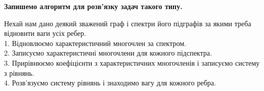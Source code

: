 \textbf{Запишемо алгоритм для розв'язку задач такого типу.}

Нехай нам дано деякий зважений граф  і  спектри його підграфів за якими треба відновити ваги усіх ребер.\\
1. Відновлюємо характеристичний многочлен за спектром.\\
2. Записуємо  характеристичні многочлени для кожного підспектра.\\ 
3. Прирівнюємо коефіцієнти з характеристичних многочленів і записуємо систему з рівнянь.\\
4. Розв'язуємо систему рівнянь і знаходимо вагу для кожного ребра.